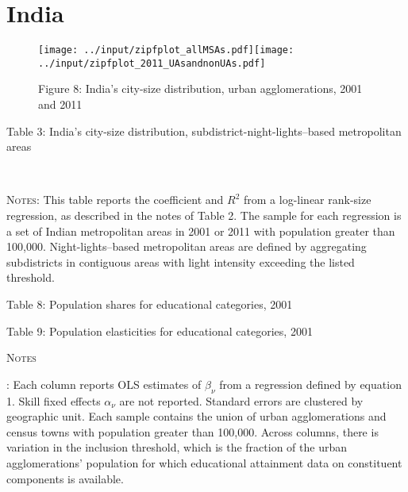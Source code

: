 \documentclass[11pt]{article}
\begin{document}
\section{India}


\begin{figure}
\caption*{Figure 8: India's city-size distribution, urban agglomerations, 2001 and 2011\label{fig:India-UAs-zipf-2001-2011}}
\centering{}\texttt{[image: ../input/zipfplot\_allMSAs.pdf]}\texttt{[image: ../input/zipfplot\_2011\_UAsandnonUAs.pdf]}
\end{figure}

\begin{table}
\caption*{Table 3: India's city-size distribution, subdistrict-night-lights--based metropolitan
areas\label{tab:India-zipf-2001-2011}}
\begin{center}
 \\
\begin{minipage}[t]{0.9\textwidth}%
{\footnotesize \textsc{Notes}:
This table reports the coefficient and $R^{2}$ from a log-linear rank-size regression, as described in the notes of Table 2.
The sample for each regression is a set of Indian metropolitan areas in 2001 or 2011
with population greater than 100,000.
Night-lights--based metropolitan areas are defined by aggregating subdistricts in contiguous areas with light intensity exceeding the listed threshold.\par
}
\end{minipage}
\end{center}
\end{table}


\begin{table} \caption*{Table 8: Population shares for educational categories, 2001} \begin{center}

\end{center}\end{table}


\begin{table}[ph]
\caption*{Table 9: Population elasticities for educational categories, 2001\label{tab:India-edu-population-elasticities}}
\begin{center}

\begin{minipage}[t]{0.9\textwidth}%
\textsc{\footnotesize{}Notes}{\footnotesize{}:
Each column reports OLS estimates of $\beta_{\nu}$ from a regression defined by equation 1.
Skill fixed effects $\alpha_{\nu}$ are not reported.
Standard errors are clustered by geographic unit.
Each sample contains the union of urban agglomerations and census towns with population greater than 100,000.
Across columns, there is variation in the inclusion threshold,
which is the fraction of the urban agglomerations' population for
which educational attainment data on constituent components is available.\par}%
\end{minipage}
\end{center}
\end{table}
\end{document}

